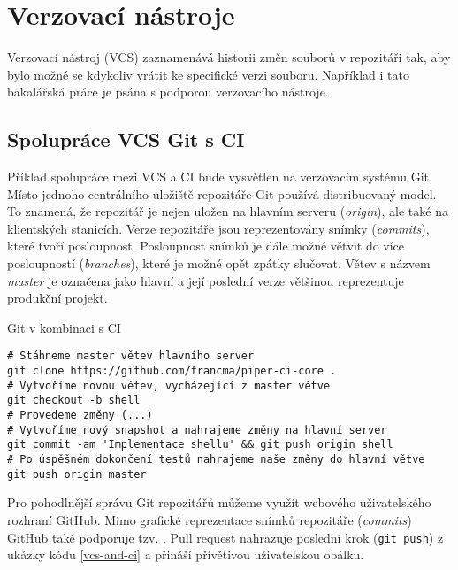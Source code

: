 \section{Verzovací nástroje}

Verzovací nástroj (VCS) zaznamenává historii změn souborů v repozitáři tak, aby bylo možné se kdykoliv vrátit ke specifické verzi souboru.
Například i tato bakalářská práce je psána s podporou verzovacího nástroje.

\subsection{Spolupráce VCS Git s CI}

Příklad spolupráce mezi VCS a CI bude vysvětlen na verzovacím systému Git.
Místo jednoho centrálního uložiště repozitáře Git používá distribuovaný model.
To znamená, že repozitář je nejen uložen na hlavním serveru (\textit{origin}), ale také na klientských stanicích.
Verze repozitáře jsou reprezentovány snímky (\textit{commits}), které tvoří posloupnost.
Posloupnost snímků je dále možné větvit do více posloupností (\textit{branches}), které je možné opět zpátky slučovat.
Větev s názvem \textit{master} je označena jako hlavní a její poslední verze většinou reprezentuje produkční projekt.


\begin{listing}[ht]
\caption{\label{vcs-and-ci}Git v kombinaci s CI}
\begin{verbatim}
# Stáhneme master větev hlavního server 
git clone https://github.com/francma/piper-ci-core .
# Vytvoříme novou větev, vycházející z master větve
git checkout -b shell
# Provedeme změny (...)
# Vytvoříme nový snapshot a nahrajeme změny na hlavní server
git commit -am 'Implementace shellu' && git push origin shell
# Po úspěšném dokončení testů nahrajeme naše změny do hlavní větve
git push origin master
\end{verbatim}
\end{listing}

Pro pohodlnější správu Git repozitářů můžeme využít webového uživatelského rozhraní GitHub.
Mimo grafické reprezentace snímků repozitáře (\textit{commits}) GitHub také podporuje tzv. . 
Pull request nahrazuje poslední krok (\verb|git push|) z ukázky kódu \ref{vcs-and-ci} a přináší přívětivou uživatelskou obálku.

